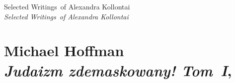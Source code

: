 \documentclass[a4paper,11pt]{article}
\numberwithin{equation}{section}
\begin{document}
\VerSpaceTwo


\noindent
\Jest Selected Writings~of Alexandra Kollontai \\
\PowinnoByc \textit{Selected Writings~of Alexandra Kollontai} \\
















\section{ %
  Michael Hoffman \\
  \textit{Judaizm zdemaskowany! Tom~I}, \cite{}}


\end{document}
